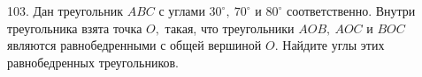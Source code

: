 103. Дан треугольник $ABC$ с углами $30^\circ,\ 70^\circ$ и $80^\circ$ соответственно. Внутри треугольника взята точка $O,$ такая, что треугольники $AOB,\ AOC$ и $BOC$ являются равнобедренными с общей вершиной $O.$ Найдите углы этих равнобедренных треугольников.\\
